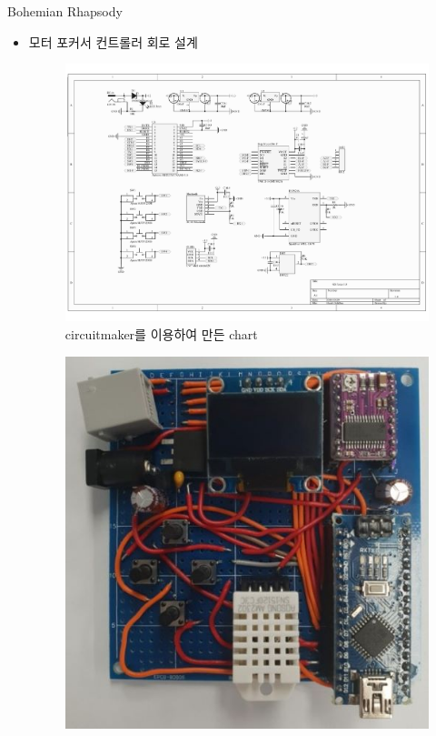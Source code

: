 \documentclass{gshs_poster_beamer}
\begin{document}
\begin{columns}[T]
\begin{posterbox}[colbacktitle=black,coltitle=white,colback=black!5]{Bohemian Rhapsody}
  \begin{itemize}
	\item 모터 포커서 컨트롤러 회로 설계
	\begin{figure}[h]
		\centering
		\includegraphics[scale=0.4]{Schematic_Prints}
		\caption{circuitmaker를 이용하여 만든 chart}
		\label{fig:Schematic_Prints}
	\end{figure}
	\begin{figure}[h]
		\centering
		\includegraphics[scale=0.6]{circuit1}

\end{figure}
\end{itemize}
\end{posterbox}
\end{columns}
\end{document}

